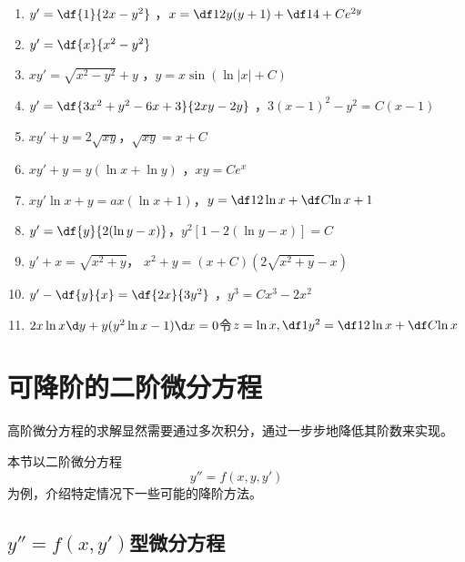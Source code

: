 \begin{enumerate}[(1)]
  \setlength{\itemindent}{1cm}
  \item $y'=\df{1}{2x-y^2}$ ，$x=\df12y(y+1)+\df14+Ce^{2y}$
  \item $y'=\df{x}{x^2-y^2}$\\
  \item $xy'=\sqrt{x^2-y^2}+y$ ，$y=x\sin(\ln|x|+C)$
  \item $y'=\df{3x^2+y^2-6x+3}{2xy-2y}$
  ，$3(x-1)^2-y^2=C(x-1)$\\
  \item $xy'+y=2\sqrt{xy}$，$\sqrt{xy}=x+C$
  \item $xy'+y=y(\ln x+\ln y) $ ，$xy=Ce^x$
  \item $xy'\ln x+y=ax(\ln x+1)$，$y=\df12\ln x+\df C{\ln x}+1$
  \item $y'=\df{y}{2(\ln y-x)}$，$y^2[1-2(\ln y-x)]=C$
  \item $y'+x=\sqrt{x^2+y}$，
  $x^2+y=(x+C)(2\sqrt{x^2+y}-x)$\\
  \item $y'-\df{y}{x}=\df{2x}{3y^2}$ ，$y^3=Cx^3-2x^2$
  \item $2x\ln x\d y+y(y^2\ln x-1)\d x=0$\dotfill 令$z=\ln x,\df1{y^2}=\df12\ln
  x+\df C{\ln x}$\\
\end{enumerate}

\section{可降阶的二阶微分方程}

高阶微分方程的求解显然需要通过多次积分，通过一步步地降低其阶数来实现。

本节以二阶微分方程
$$y''=f(x,y,y')$$
为例，介绍特定情况下一些可能的降阶方法。

\subsection{$y''=f(x,y')$型微分方程}

